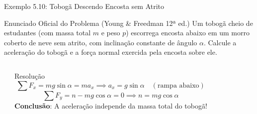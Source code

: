 \documentclass[10pt,aspectratio=169]{beamer}
\begin{document}
\begin{frame}{Exemplo 5.10: Tobogã Descendo Encosta sem Atrito}
    \begin{block}{Enunciado Oficial do Problema (Young \& Freedman 12ª ed.)}
        \small
        Um tobogã cheio de estudantes (com massa total $m$ e peso $p$) escorrega encosta abaixo em um morro coberto de neve sem atrito, com inclinação constante de ângulo $\alpha$. Calcule a aceleração do tobogã e a força normal exercida pela encosta sobre ele.
    \end{block}
    \begin{columns}[T]
        \begin{center}
        \end{center}
        \begin{exampleblock}{Resolução}
            \small
            $$\sum F_x = mg \sin\alpha = m a_x \implies a_x = g \sin\alpha \quad (\text{rampa abaixo})$$
            $$\sum F_y = n - mg \cos\alpha = 0 \implies n = mg \cos\alpha$$
            \textbf{Conclusão}: A aceleração independe da massa total do tobogã!
        \end{exampleblock}
    \end{columns}
\end{frame}
\end{document}
